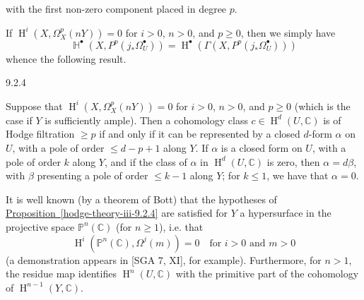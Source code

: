     with the first non-zero component placed in degree \(p\).\par{}If \(\operatorname {H}^i(X,\Omega _X^p(nY))=0\) for \(i>0\), \(n>0\), and \(p\geqslant 0\), then we simply have
    \[       \operatorname {\mathbb {H}}^\bullet (X,P^p(j_*\Omega _U^\bullet ))       = \operatorname {H}^\bullet (\Gamma (X,P^p(j_*\Omega _U^\bullet )))     \]
    whence the following result.\begin{proposition}{9.2.4}\label{hodge-theory-iii-9.2.4}\skipsinglepar\par{}Suppose that \(\operatorname {H}^i(X,\Omega _X^p(nY))=0\) for \(i>0\), \(n>0\), and \(p\geqslant 0\) (which is the case if \(Y\) is sufficiently ample).
    Then a cohomology class \(c\in \operatorname {H}^d(U,\mathbb {C})\) is of Hodge filtration \(\geqslant  p\) if and only if it can be represented by a closed \(d\)-form \(\alpha \) on \(U\), with a pole of order \(\leqslant  d-p+1\) along \(Y\).
    If \(\alpha \) is a closed form on \(U\), with a pole of order \(k\) along \(Y\), and if the class of \(\alpha \) in \(\operatorname {H}^d(U,\mathbb {C})\) is zero, then \(\alpha =d\beta \), with \(\beta \) presenting a pole of order \(\leqslant  k-1\) along \(Y\);
    for \(k\leqslant 1\), we have that \(\alpha =0\).\end{proposition}\label{hodge-theory-iii-9.2.5}\par{}It is well known (by a theorem of Bott) that the hypotheses of \hyperref[hodge-theory-iii-9.2.4]{Proposition~\ref*{hodge-theory-iii-9.2.4}} are satisfied for \(Y\) a hypersurface in the projective space \(\mathbb {P}^n(\mathbb {C})\) (for \(n\geqslant 1\)), i.e. that
    \[       \operatorname {H}^i(\mathbb {P}^n(\mathbb {C}),\Omega ^j(m))       = 0       \quad        \text {for }i>0\text { and }m>0     \]
    (a demonstration appears in [SGA 7, XI], for example).
    Furthermore, for \(n>1\), the residue map identifies \(\operatorname {H}^n(U,\mathbb {C})\) with the primitive part of the cohomology of \(\operatorname {H}^{n-1}(Y,\mathbb {C})\).
